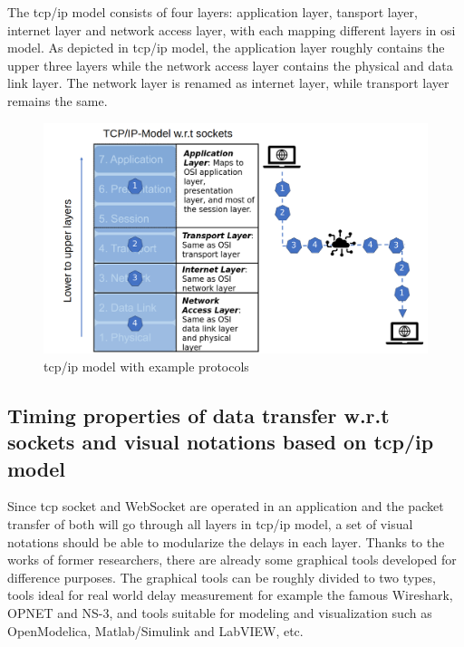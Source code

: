 The \gls{tcp/ip} model consists of four layers: application layer, tansport layer, 
internet layer and network access layer, with each mapping different layers in 
\gls{osi} model. As depicted in \gls{tcp/ip} model, 
the application layer roughly contains the upper three layers while the network access layer 
contains the physical and data link layer. The network layer is renamed as internet layer, 
while transport layer remains the same. 

\begin{figure}[htb]
    \includegraphics[width=\textwidth]{figures/TCP_IP.png}
    
    \centering
    \caption{\gls{tcp/ip} model with example protocols \label{fig: TCP_IP}}
\end{figure}

\subsection{Timing properties of data transfer w.r.t sockets and visual notations based on \gls{tcp/ip} model}
Since \gls{tcp} socket and WebSocket are operated in an application 
and the packet transfer of both will go through all layers in \gls{tcp/ip} model, 
a set of visual notations should be able to modularize the delays in each layer.
Thanks to the works of former researchers, there are already some graphical 
tools developed for difference purposes. The graphical tools 
can be roughly divided to two types, tools ideal for real world delay measurement 
for example the famous Wireshark, OPNET and NS-3, 
and tools suitable for modeling and visualization such as OpenModelica, 
Matlab/Simulink and LabVIEW, etc.



